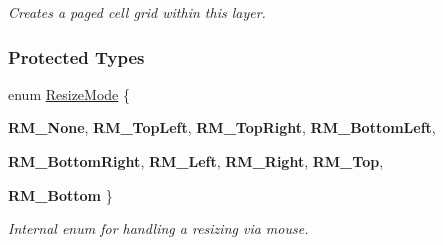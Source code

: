 \begin{DoxyCompactItemize}
\begin{DoxyCompactList}\small\item\em Creates a paged cell grid within this layer. \item\end{DoxyCompactList}\end{DoxyCompactItemize}
\subsubsection*{Protected Types}
\begin{DoxyCompactItemize}
\item 
enum \hyperlink{classphys_1_1UI_1_1Window_ab7ecb300d312f54556615d3a3b8c6dc9}{ResizeMode} \{ \par
{\bfseries RM\_\-None}, 
{\bfseries RM\_\-TopLeft}, 
{\bfseries RM\_\-TopRight}, 
{\bfseries RM\_\-BottomLeft}, 
\par
{\bfseries RM\_\-BottomRight}, 
{\bfseries RM\_\-Left}, 
{\bfseries RM\_\-Right}, 
{\bfseries RM\_\-Top}, 
\par
{\bfseries RM\_\-Bottom}
 \}
\begin{DoxyCompactList}\small\item\em Internal enum for handling a resizing via mouse. \item\end{DoxyCompactList}\end{DoxyCompactItemize}
